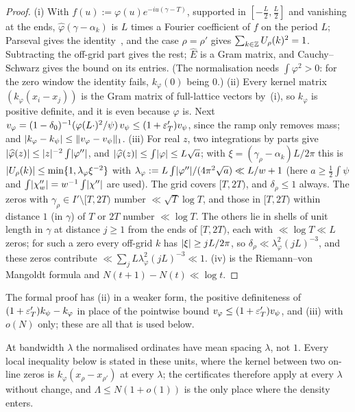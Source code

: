 \begin{proof}
(i) With $f(u):=\varphi(u)e^{-iu(\gamma-T)}$, supported in $[-\frac L2,\frac L2]$ and vanishing at the ends, $\widehat\varphi(\gamma-\alpha_k)$ is
$L$ times a Fourier coefficient of $f$ on the period $L$; Parseval gives the identity~\cite[Lemma~2.1]{AF}, and the case $\rho=\rho'$ gives
$\sum_{k\in\mathbb Z}U_\rho(k)^2=1$. Subtracting the off-grid part gives the rest; $\widehat E$ is a Gram matrix, and Cauchy--Schwarz gives the bound on its
entries. (The normalisation needs $\int\varphi^2>0$: for the zero window the identity fails, $k_\varphi(0)$ being $0$.)
(ii) Every kernel matrix $(k_\varphi(x_i-x_j))$ is the Gram matrix of full-lattice vectors by~(i), so $k_\varphi$ is positive definite, and it is
even because $\varphi$ is. Next $v_\varphi=(1-\delta_0)^{-1}(\varphi(L\cdot)^2/\psi)\,v_\psi\le(1+\varepsilon_T')v_\psi$, since the ramp only removes mass;
and $\lvert k_\varphi-k_\psi\rvert\le\lVert v_\varphi-v_\psi\rVert_1$.
(iii) For real $z$, two integrations by parts give $\lvert \widehat\varphi(z)\rvert\le\lvert z\rvert^{-2}\int\lvert \varphi''\rvert$, and
$\lvert \widehat\varphi(z)\rvert\le\int\lvert \varphi\rvert\le L\sqrt a$; with $\xi=(\gamma_\rho-\alpha_k)L/2\pi$ this is
$\lvert U_\rho(k)\rvert\le\min\{1,\lambda_\varphi\xi^{-2}\}$ with $\lambda_\varphi:=L\int\lvert \varphi''\rvert/(4\pi^2\sqrt a)\ll L/w+1$ (here
$a\ge\frac12\int\psi$ and $\int\lvert \chi_w''\rvert=w^{-1}\int\lvert \chi''\rvert$ are used). The grid covers $[T,2T)$, and $\delta_\rho\le1$ always. The zeros with $\gamma_\rho\in I'\setminus[T,2T)$ number
$\ll\sqrt T\log T$, and those in $[T,2T)$ within distance $1$ (in $\gamma$) of $T$ or $2T$ number $\ll\log T$. The others lie in shells of unit
length in $\gamma$ at distance $j\ge1$ from the ends of $[T,2T)$, each with $\ll\log T\ll L$ zeros; for such a zero every off-grid $k$ has
$\lvert \xi\rvert\ge jL/2\pi$, so $\delta_\rho\ll\lambda_\varphi^2(jL)^{-3}$, and these zeros contribute $\ll\sum_jL\lambda_\varphi^2(jL)^{-3}\ll1$.
(iv) is the Riemann--von Mangoldt formula and $N(t+1)-N(t)\ll\log t$.
\end{proof}

The formal proof has (ii) in a weaker form, the positive definiteness of $(1+\varepsilon_T')k_\psi-k_\varphi$ in place of the pointwise bound
$v_\varphi\le(1+\varepsilon_T')v_\psi$, and (iii) with $o(N)$ only; these are all that is used below.

At bandwidth $\lambda$ the normalised ordinates have mean spacing $\lambda$, not $1$. Every local inequality below is stated in these units,
where the kernel between two on-line zeros is $k_\varphi(x_\rho-x_{\rho'})$ at every $\lambda$; the certificates therefore apply at every
$\lambda$ without change, and $\Lambda\le N(1+o(1))$ is the only place where the density enters.

